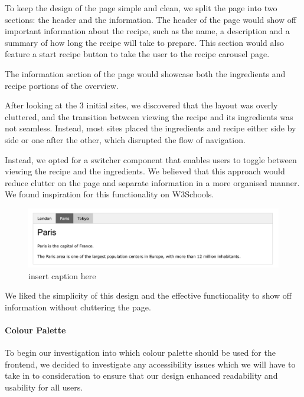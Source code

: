 \documentclass{article}
\begin{document}
    To keep the design of the page simple and clean, we split the page into two sections: the header and the information. The header of the page would show off important information about the recipe, such as the name, a description and a summary of how long the recipe will take to prepare. This section would also feature a start recipe button to take the user to the recipe carousel page.
    
    The information section of the page would showcase both the ingredients and recipe portions of the overview.
    
    After looking at the 3 initial sites, we discovered that the layout was overly cluttered, and the transition between viewing the recipe and its ingredients was not seamless. Instead, most sites placed the ingredients and recipe either side by side or one after the other, which disrupted the flow of navigation.
    
    Instead, we opted for a switcher component that enables users to toggle between viewing the recipe and the ingredients. We believed that this approach would reduce clutter on the page and separate information in a more organised manner. We found inspiration for this functionality on W3Schools.
    
    \begin{figure}
      \includegraphics[width=1.0\textwidth]{W3Schools tabbed component.png}
      \centering
      \caption{insert caption here}
    \end{figure}

    We liked the simplicity of this design and the effective functionality to show off information without cluttering the page. 

    \paragraph{Colour Palette}
    To begin our investigation into which colour palette should be used for the frontend, we decided to investigate any accessibility issues which we will have to take in to consideration to ensure that our design enhanced readability and usability for all users. 
\end{document}
